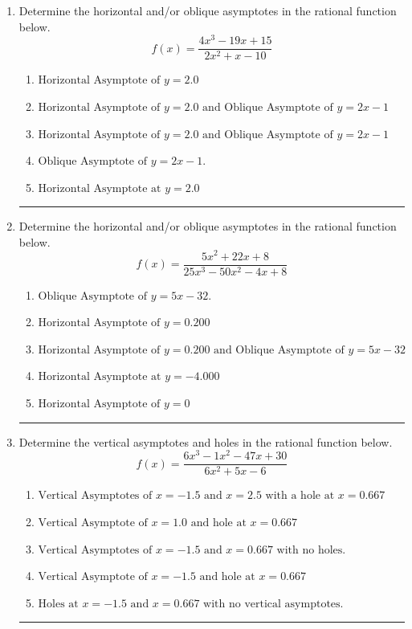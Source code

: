 \documentclass[14pt]{extbook}
\newcommand{\litem}[1]{\item#1\hspace*{-1cm}\rule{\textwidth}{0.4pt}}
\begin{document}
\begin{enumerate}
{\begin{enumerate}[label=\Alph*.]
\end{enumerate} }
\litem{
Determine the horizontal and/or oblique asymptotes in the rational function below.\[ f(x) = \frac{4x^{3} -19 x + 15}{2x^{2} +x -10} \]\begin{enumerate}[label=\Alph*.]
\item \( \text{Horizontal Asymptote of } y = 2.0  \)
\item \( \text{Horizontal Asymptote of } y = 2.0 \text{ and Oblique Asymptote of } y = 2x -1 \)
\item \( \text{Horizontal Asymptote of } y = 2.0 \text{ and Oblique Asymptote of } y = 2x -1 \)
\item \( \text{Oblique Asymptote of } y = 2x -1. \)
\item \( \text{Horizontal Asymptote at } y = 2.0 \)

\end{enumerate} }
\litem{
Determine the horizontal and/or oblique asymptotes in the rational function below.\[ f(x) = \frac{5x^{2} +22 x + 8}{25x^{3} -50 x^{2} -4 x + 8} \]\begin{enumerate}[label=\Alph*.]
\item \( \text{Oblique Asymptote of } y = 5x -32. \)
\item \( \text{Horizontal Asymptote of } y = 0.200  \)
\item \( \text{Horizontal Asymptote of } y = 0.200 \text{ and Oblique Asymptote of } y = 5x -32 \)
\item \( \text{Horizontal Asymptote at } y = -4.000 \)
\item \( \text{Horizontal Asymptote of } y = 0 \)

\end{enumerate} }
\litem{
Determine the vertical asymptotes and holes in the rational function below.\[ f(x) = \frac{6x^{3} -1 x^{2} -47 x + 30}{6x^{2} +5 x -6} \]\begin{enumerate}[label=\Alph*.]
\item \( \text{Vertical Asymptotes of } x = -1.5 \text{ and } x = 2.5 \text{ with a hole at } x = 0.667 \)
\item \( \text{Vertical Asymptote of } x = 1.0 \text{ and hole at } x = 0.667 \)
\item \( \text{Vertical Asymptotes of } x = -1.5 \text{ and } x = 0.667 \text{ with no holes.} \)
\item \( \text{Vertical Asymptote of } x = -1.5 \text{ and hole at } x = 0.667 \)
\item \( \text{Holes at } x = -1.5 \text{ and } x = 0.667 \text{ with no vertical asymptotes.} \)


\end{enumerate}}
\end{enumerate}
\end{document}
